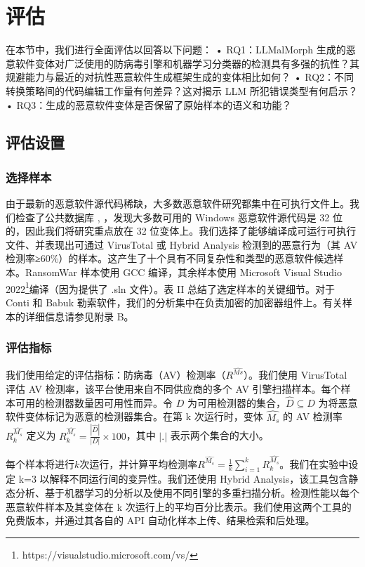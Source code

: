 \chapter{评估}
在本节中，我们进行全面评估以回答以下问题：
• RQ1：LLMalMorph 生成的恶意软件变体对广泛使用的防病毒引擎和机器学习分类器的检测具有多强的抗性？其规避能力与最近的对抗性恶意软件生成框架生成的变体相比如何？
• RQ2：不同转换策略间的代码编辑工作量有何差异？这对揭示 LLM 所犯错误类型有何启示？
• RQ3：生成的恶意软件变体是否保留了原始样本的语义和功能？

\section{评估设置}

\subsection{选择样本}
由于最新的恶意软件源代码稀缺，大多数恶意软件研究都集中在可执行文件上。我们检查了公共数据库 \parencite{Cryptware2024}, \parencite{Vxunderground2024}，发现大多数可用的 Windows 恶意软件源代码是 32 位的，因此我们将研究重点放在 32 位变体上。我们选择了能够编译成可运行可执行文件、并表现出可通过 VirusTotal 或 Hybrid Analysis 检测到的恶意行为（其 AV 检测率≥60\%）的样本。这产生了十个具有不同复杂性和类型的恶意软件候选样本。RansomWar 样本使用 GCC 编译，其余样本使用 Microsoft Visual Studio 2022\footnote{https://visualstudio.microsoft.com/vs/}编译（因为提供了 .sln 文件）。表 II 总结了选定样本的关键细节。对于 Conti 和 Babuk 勒索软件，我们的分析集中在负责加密的加密器组件上。有关样本的详细信息请参见附录 B。

\subsection{评估指标}
我们使用给定的评估指标：防病毒（AV）检测率（$R^{\hat{Ms}}$）。我们使用 VirusTotal 评估 AV 检测率，该平台使用来自不同供应商的多个 AV 引擎扫描样本。每个样本可用的检测器数量因可用性而异。令 $D$ 为可用检测器的集合，$\hat{D} \subseteq D$ 为将恶意软件变体标记为恶意的检测器集合。在第 k 次运行时，变体 $\hat{M_{s}}$ 的 AV 检测率 $R^{\hat{M_{s}}}_{k}$ 定义为 $R^{\hat{M_{s}}}_{k} = \frac{|\hat{D}|}{|D|} \times 100$，其中 $|.|$ 表示两个集合的大小。

每个样本将进行$k$次运行，并计算平均检测率$R^{\hat{M_{s}}}=\frac{1}{k} \sum_{i=1}^{k} R_{k}^{\hat{M_{s}}}$。我们在实验中设定 k=3 以解释不同运行间的变异性。我们还使用 Hybrid Analysis，该工具包含静态分析、基于机器学习的分析以及使用不同引擎的多重扫描分析。检测性能以每个恶意软件样本及其变体在 k 次运行上的平均百分比表示。我们使用这两个工具的免费版本，并通过其各自的 API 自动化样本上传、结果检索和后处理。

